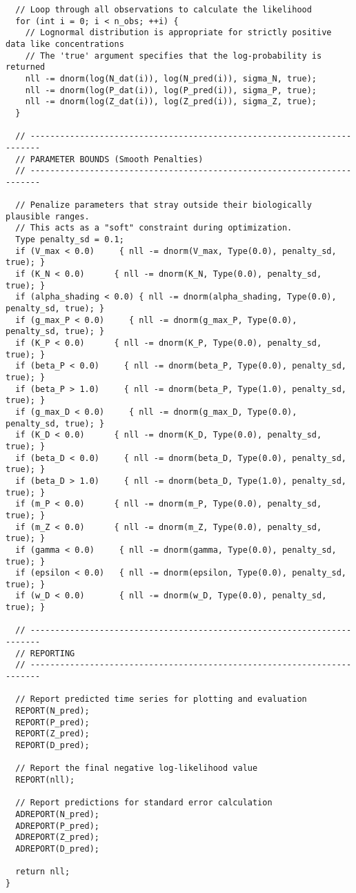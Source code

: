 \begin{lstlisting}
  // Loop through all observations to calculate the likelihood
  for (int i = 0; i < n_obs; ++i) {
    // Lognormal distribution is appropriate for strictly positive data like concentrations
    // The 'true' argument specifies that the log-probability is returned
    nll -= dnorm(log(N_dat(i)), log(N_pred(i)), sigma_N, true);
    nll -= dnorm(log(P_dat(i)), log(P_pred(i)), sigma_P, true);
    nll -= dnorm(log(Z_dat(i)), log(Z_pred(i)), sigma_Z, true);
  }

  // ------------------------------------------------------------------------
  // PARAMETER BOUNDS (Smooth Penalties)
  // ------------------------------------------------------------------------
  
  // Penalize parameters that stray outside their biologically plausible ranges.
  // This acts as a "soft" constraint during optimization.
  Type penalty_sd = 0.1;
  if (V_max < 0.0)     { nll -= dnorm(V_max, Type(0.0), penalty_sd, true); }
  if (K_N < 0.0)      { nll -= dnorm(K_N, Type(0.0), penalty_sd, true); }
  if (alpha_shading < 0.0) { nll -= dnorm(alpha_shading, Type(0.0), penalty_sd, true); }
  if (g_max_P < 0.0)     { nll -= dnorm(g_max_P, Type(0.0), penalty_sd, true); }
  if (K_P < 0.0)      { nll -= dnorm(K_P, Type(0.0), penalty_sd, true); }
  if (beta_P < 0.0)     { nll -= dnorm(beta_P, Type(0.0), penalty_sd, true); }
  if (beta_P > 1.0)     { nll -= dnorm(beta_P, Type(1.0), penalty_sd, true); }
  if (g_max_D < 0.0)     { nll -= dnorm(g_max_D, Type(0.0), penalty_sd, true); }
  if (K_D < 0.0)      { nll -= dnorm(K_D, Type(0.0), penalty_sd, true); }
  if (beta_D < 0.0)     { nll -= dnorm(beta_D, Type(0.0), penalty_sd, true); }
  if (beta_D > 1.0)     { nll -= dnorm(beta_D, Type(1.0), penalty_sd, true); }
  if (m_P < 0.0)      { nll -= dnorm(m_P, Type(0.0), penalty_sd, true); }
  if (m_Z < 0.0)      { nll -= dnorm(m_Z, Type(0.0), penalty_sd, true); }
  if (gamma < 0.0)     { nll -= dnorm(gamma, Type(0.0), penalty_sd, true); }
  if (epsilon < 0.0)   { nll -= dnorm(epsilon, Type(0.0), penalty_sd, true); }
  if (w_D < 0.0)       { nll -= dnorm(w_D, Type(0.0), penalty_sd, true); }

  // ------------------------------------------------------------------------
  // REPORTING
  // ------------------------------------------------------------------------

  // Report predicted time series for plotting and evaluation
  REPORT(N_pred);
  REPORT(P_pred);
  REPORT(Z_pred);
  REPORT(D_pred);

  // Report the final negative log-likelihood value
  REPORT(nll);

  // Report predictions for standard error calculation
  ADREPORT(N_pred);
  ADREPORT(P_pred);
  ADREPORT(Z_pred);
  ADREPORT(D_pred);

  return nll;
}
\end{lstlisting}

